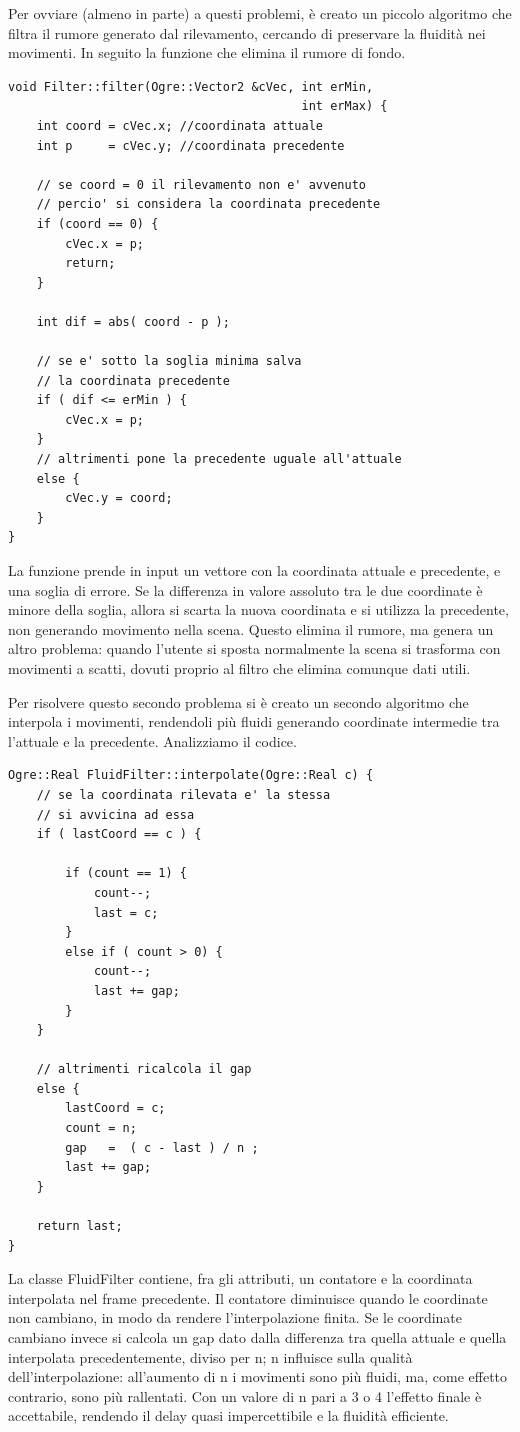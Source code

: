 Per ovviare (almeno in parte) a questi problemi, è creato un piccolo algoritmo che filtra il rumore generato dal rilevamento, cercando di preservare la fluidità nei movimenti. In seguito la funzione che elimina il rumore di fondo.
\begin{lstlisting}
void Filter::filter(Ogre::Vector2 &cVec, int erMin,
                                         int erMax) {
    int coord = cVec.x; //coordinata attuale
    int p     = cVec.y; //coordinata precedente
	
    // se coord = 0 il rilevamento non e' avvenuto
    // percio' si considera la coordinata precedente
    if (coord == 0) {
        cVec.x = p;
        return;
    }
    
    int dif = abs( coord - p );
    
    // se e' sotto la soglia minima salva 
    // la coordinata precedente
    if ( dif <= erMin ) {
        cVec.x = p;     	
    }
    // altrimenti pone la precedente uguale all'attuale
    else {
        cVec.y = coord;	
    }  
}
\end{lstlisting} 

La funzione prende in input un vettore con la coordinata attuale e precedente, e una soglia di errore.
Se la differenza in valore assoluto tra le due coordinate è minore della soglia, allora si scarta la nuova coordinata e si utilizza la precedente, non generando movimento nella scena. Questo elimina il rumore, ma genera un altro problema: quando l'utente si sposta normalmente la scena si trasforma con movimenti a scatti, dovuti proprio al filtro che elimina comunque dati utili.

Per risolvere questo secondo problema si è creato un secondo algoritmo che interpola i movimenti, rendendoli più fluidi generando coordinate intermedie tra l'attuale e la precedente. Analizziamo il codice.
\begin{lstlisting}
Ogre::Real FluidFilter::interpolate(Ogre::Real c) {
    // se la coordinata rilevata e' la stessa
    // si avvicina ad essa
    if ( lastCoord == c ) {

        if (count == 1) {
            count--;
            last = c;
        }
        else if ( count > 0) {
            count--;
            last += gap;
        }
    }
    
    // altrimenti ricalcola il gap
    else {
        lastCoord = c;
        count = n;
        gap   =  ( c - last ) / n ;
        last += gap;
    }
    
    return last;
}
\end{lstlisting} 
La classe FluidFilter contiene, fra gli attributi, un contatore e la coordinata interpolata nel frame precedente. Il contatore diminuisce quando le coordinate non cambiano, in modo da rendere l'interpolazione finita. Se le coordinate cambiano invece si calcola un gap dato dalla differenza tra quella attuale e quella interpolata precedentemente, diviso per n; n influisce sulla qualità dell'interpolazione: all'aumento di n i movimenti sono più fluidi, ma, come effetto contrario, sono più rallentati. Con un valore di n pari a 3 o 4 l'effetto finale è accettabile, rendendo il delay quasi impercettibile e la fluidità efficiente.


